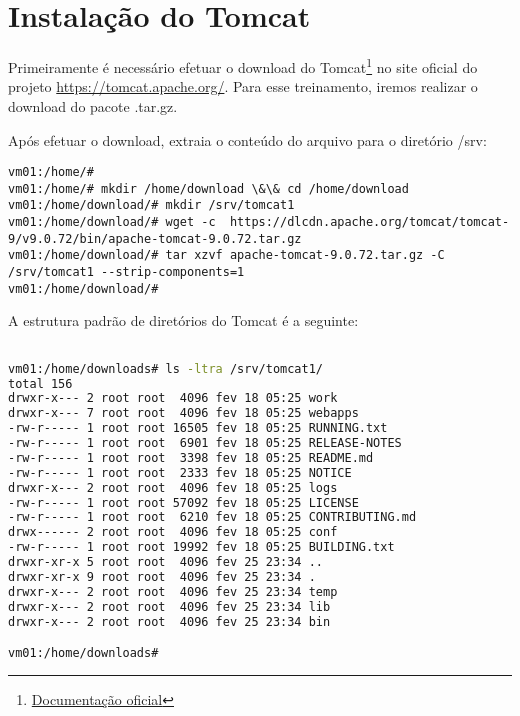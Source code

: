 \section{Instalação do Tomcat}

Primeiramente é necessário efetuar o download do Tomcat\footnote{ \href{https://tomcat.apache.org/tomcat-9.0-doc/index.html} {Documentação oficial}} no site oficial do projeto \url{https://tomcat.apache.org/}. Para esse treinamento, iremos realizar o download do pacote .tar.gz. 

Após efetuar o download, extraia o conteúdo do arquivo para o diretório /srv:

\begin{lstlisting}[breaklines=true,basicstyle=\firacoderetina,
breaklines=true,caption=\firacoderetina Download e extração do tomcat,
postbreak=\mbox{\textcolor{red}{$\hookrightarrow$}\space},
showstringspaces=false]
vm01:/home/#	
vm01:/home/# mkdir /home/download \&\& cd /home/download
vm01:/home/download/# mkdir /srv/tomcat1
vm01:/home/download/# wget -c  https://dlcdn.apache.org/tomcat/tomcat-9/v9.0.72/bin/apache-tomcat-9.0.72.tar.gz
vm01:/home/download/# tar xzvf apache-tomcat-9.0.72.tar.gz -C /srv/tomcat1 --strip-components=1
vm01:/home/download/# 
\end{lstlisting}

A estrutura padrão de diretórios do Tomcat é a seguinte:

\begin{lstlisting}[language=sh]

vm01:/home/downloads# ls -ltra /srv/tomcat1/
total 156
drwxr-x--- 2 root root  4096 fev 18 05:25 work
drwxr-x--- 7 root root  4096 fev 18 05:25 webapps
-rw-r----- 1 root root 16505 fev 18 05:25 RUNNING.txt
-rw-r----- 1 root root  6901 fev 18 05:25 RELEASE-NOTES
-rw-r----- 1 root root  3398 fev 18 05:25 README.md
-rw-r----- 1 root root  2333 fev 18 05:25 NOTICE
drwxr-x--- 2 root root  4096 fev 18 05:25 logs
-rw-r----- 1 root root 57092 fev 18 05:25 LICENSE
-rw-r----- 1 root root  6210 fev 18 05:25 CONTRIBUTING.md
drwx------ 2 root root  4096 fev 18 05:25 conf
-rw-r----- 1 root root 19992 fev 18 05:25 BUILDING.txt
drwxr-xr-x 5 root root  4096 fev 25 23:34 ..
drwxr-xr-x 9 root root  4096 fev 25 23:34 .
drwxr-x--- 2 root root  4096 fev 25 23:34 temp
drwxr-x--- 2 root root  4096 fev 25 23:34 lib
drwxr-x--- 2 root root  4096 fev 25 23:34 bin

vm01:/home/downloads# 

\end{lstlisting}

